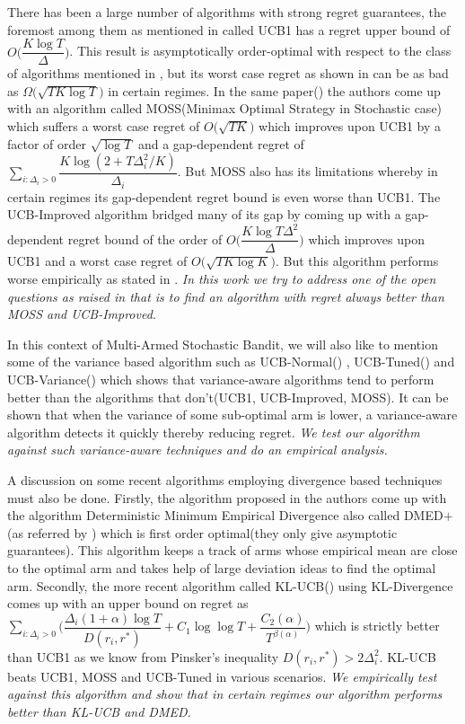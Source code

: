 	There has been a large number of algorithms with strong regret guarantees, the foremost among them as mentioned in \cite{auer2002finite} called UCB1 has a regret upper bound of $O\bigg(\dfrac{K\log T}{\Delta}\bigg)$. This result is asymptotically order-optimal with respect to the class of algorithms mentioned in \cite{lai1985asymptotically}, but its worst case regret as shown in \cite{audibert2009minimax} can be as bad as $\Omega \bigg(\sqrt{TK\log T}\bigg)$ in certain regimes.  In the same paper(\cite{audibert2009minimax}) the authors come up with an algorithm called MOSS(Minimax Optimal  Strategy in Stochastic case) which suffers a worst case regret of $O\bigg(\sqrt{TK}\bigg)$ which improves upon UCB1 by a factor of order $\sqrt{\log T}$ and a gap-dependent regret of $\sum_{i:\Delta_{i}>0}\dfrac{K\log(2+T\Delta_{i}^{2}/K)}{\Delta_{i}}$. But MOSS also has its limitations whereby in certain regimes its gap-dependent regret bound is even worse than UCB1. The UCB-Improved algorithm bridged many of its gap by coming up with a gap-dependent regret bound of the order of $O\bigg(\dfrac{K\log T\Delta^{2}}{\Delta}\bigg)$ which improves upon UCB1 and a worst case regret of $O\bigg(\sqrt{TK\log K}\bigg)$. But this algorithm performs worse empirically as stated in \cite{lattimore2015optimally}. \textit{In this work we try to address one of the open questions as raised in \cite{bubeck2012regret} that is to find an algorithm with regret always better than MOSS and UCB-Improved.}
	
	In this context of Multi-Armed Stochastic Bandit, we will also like to mention some of the variance based algorithm such as UCB-Normal(\cite{auer2002finite}) , UCB-Tuned(\cite{auer2002finite}) and UCB-Variance(\cite{audibert2009exploration}) which shows that variance-aware algorithms tend to perform better than the algorithms that don't(UCB1, UCB-Improved, MOSS). It can be shown that  when the variance of some sub-optimal arm is lower, a variance-aware algorithm detects it quickly thereby reducing  regret. \textit{We test our algorithm against such variance-aware techniques and do an empirical analysis.} 
	
	A discussion on some recent algorithms employing divergence based techniques must also be done. Firstly, the algorithm proposed in \cite{honda2010asymptotically} the authors come up with the algorithm Deterministic Minimum Empirical Divergence also called DMED$+$(as referred by \cite{garivier2011kl}) which is first order optimal(they only give asymptotic guarantees). This algorithm keeps a track of arms whose empirical mean are close to the optimal arm and takes help of large deviation ideas to find the optimal arm. Secondly, the more recent algorithm called KL-UCB(\cite{garivier2011kl}) using KL-Divergence comes up with an upper bound on regret as $\sum_{i:\Delta_{i}>0}\bigg(\dfrac{\Delta_{i}(1+\alpha)\log T}{D(r_{i},r^{*})}+C_{1}\log\log T+\dfrac{C_{2}(\alpha)}{T^{\beta(\alpha)}}\bigg)$ which is strictly better than UCB1 as we know from Pinsker's inequality $D(r_{i},r^{*}) > 2\Delta_{i}^{2}$. KL-UCB beats UCB1, MOSS and UCB-Tuned in various scenarios. \textit{We empirically test against this algorithm and show that in certain regimes our algorithm performs better than KL-UCB and DMED.}
	
